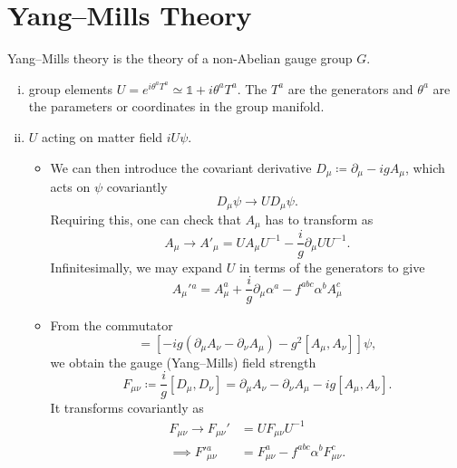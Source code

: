 \section{Yang--Mills Theory}%
\label{sec:yang_mills_theory}

Yang--Mills theory is the theory of a non-Abelian gauge group $G$.

\begin{enumerate}[(i)]
  \item group elements $U = e^{i \theta^a T^a} \simeq \mathbb{1} + i \theta^a T^a$. The $T^a$ are the generators and  $\theta^a$ are the parameters or coordinates in the group manifold.
   \item $U$  acting on matter field $i U \psi$. 
     \begin{itemize}
       \item We can then introduce the covariant derivative $D_{\mu} \coloneqq \partial_{\mu} - i g A_{\mu}$, which acts on $\psi$ covariantly
       \begin{equation}
         D_{\mu} \psi \to U D_{\mu} \psi.
       \end{equation} 
       Requiring this, one can check that $A_{\mu}$ has to transform as
       \begin{equation}
         A_{\mu} \to A'_{\mu} = U A_{\mu} U^{-1} - \frac{i}{g} \partial_{\mu} U U^{-1}.
       \end{equation}
       Infinitesimally, we may expand $U$ in terms of the generators to give
       \begin{equation}
         A_{\mu}'{}^a = A^a_{\mu} + \frac{i}{g} \partial_{\mu} \alpha^a - f^{abc} \alpha^b A^c_{\mu}
       \end{equation}
       \item From the commutator
	 \begin{equation}
	   [D_{\mu}, D_{\nu}] = \left[ -i g (\partial_{\mu} A_{\nu} - \partial_{\nu} A_{\mu}) -g^2 [A_{\mu}, A_{\nu}] \right] \psi,
	 \end{equation}
	 we obtain the gauge (Yang--Mills) field strength
	 \begin{equation}
	   \label{eq:12-f}
	   F_{\mu\nu} \coloneqq \frac{i}{g} [D_{\mu}, D_{\nu}] = \partial_{\mu} A_{\nu} - \partial_{\nu} A_{\mu} - i g [A_{\mu}, A_{\nu}].
	 \end{equation}
	 It transforms covariantly as
	 \begin{align}
	   F_{\mu\nu} \to F_{\mu\nu}'{} &= U F_{\mu\nu} U^{-1} \\
	   \implies F'{}^a_{\mu\nu} &= F_{\mu\nu}^a - f^{abc} \alpha^b F_{\mu\nu}^c.
	 \end{align}
     \end{itemize}
\end{enumerate}
